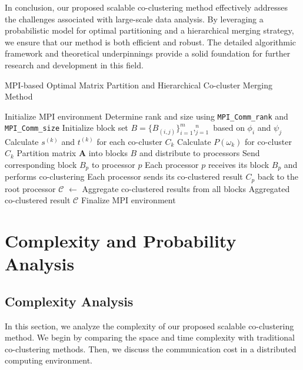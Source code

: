\documentclass[journal]{IEEEtran}
\begin{document}
In conclusion, our proposed scalable co-clustering method effectively addresses the challenges associated with large-scale data analysis. By leveraging a probabilistic model for optimal partitioning and a hierarchical merging strategy, we ensure that our method is both efficient and robust. The detailed algorithmic framework and theoretical underpinnings provide a solid foundation for further research and development in this field.

\begin{algorithm}[!t]
  \caption{MPI-based Optimal Matrix Partition and Hierarchical Co-cluster Merging Method}\label{alg:mpi_method}
  \begin{algorithmic}[1]
    \STATE Initialize MPI environment
    \STATE Determine rank and size using \texttt{MPI\_Comm\_rank} and \texttt{MPI\_Comm\_size}
    \STATE Initialize block set $B = \{B_{(i,j)}\}_{i=1}^m,_{j=1}^n$ based on $\phi_i$ and $\psi_j$
    \STATE Calculate $s^{(k)}$ and $t^{(k)}$ for each co-cluster $C_k$
    \STATE Calculate $P(\omega_k)$ for co-cluster $C_k$
    \STATE Partition matrix $\mathbf{A}$ into blocks $B$ and distribute to processors
    \STATE Send corresponding block $B_p$ to processor $p$
    \ENDFOR
    \ENDIF
    \ENDFOR
    \ENDIF
    \STATE Each processor $p$ receives its block $B_p$ and performs co-clustering
    \STATE Each processor sends its co-clustered result $C_p$ back to the root processor
    \STATE $\mathcal{C}$ $\gets$ Aggregate co-clustered results from all blocks
    \RETURN Aggregated co-clustered result $\mathcal{C}$
    \ENDIF
    \STATE Finalize MPI environment
  \end{algorithmic}
\end{algorithm}

\section{Complexity and Probability Analysis}

\label{sec:analysis}

\subsection{Complexity Analysis}
\label{subsec:complexity}
In this section, we analyze the complexity of our proposed scalable co-clustering method. We begin by comparing the space and time complexity with traditional co-clustering methods. Then, we discuss the communication cost in a distributed computing environment.
\end{document}
